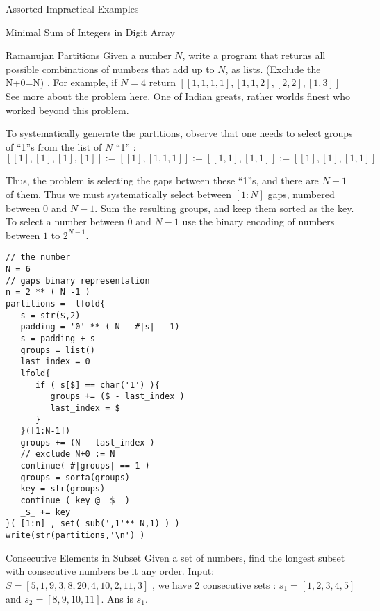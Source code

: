 \begin{section}{Assorted Impractical Examples}
\begin{subsection}{Minimal Sum of Integers in Digit Array}
\end{subsection}

\begin{subsection}{Ramanujan Partitions}
Given a number $N$, write a program that returns all possible combinations of numbers that add up to $N$, as lists. 
(Exclude the N+0=N) . For example, if $N=4$ return $[[1,1,1,1],[1,1,2],[2,2],[1,3]]$
See more about the problem \href{https://en.wikipedia.org/wiki/Partition\_(number\_theory)}{here}. 
One of Indian greats, rather worlds finest who \href{https://en.wikipedia.org/wiki/Ramanujan\%27s\_congruences}{worked} 
beyond this problem.

To systematically generate the partitions, observe that one needs to select groups of ``1''s from the list of $N$ ``1'' :
$$
[[1],[1],[1],[1]] := [ [1],[1,1,1] ] := [[1,1] ,[1,1] ] := [[1],[1],[1,1] ]
$$

Thus, the problem is selecting the gaps between these ``1''s, and there are $N-1$ of them.
Thus we must systematically select between $[1:N]$ gaps, numbered between $0$ and $N-1$. 
Sum the resulting groups, and keep them sorted as the key. To select a number between $0$ and $N-1$
use the binary encoding of numbers between $1$ to $2^{N-1}$.

\begin{center}\begin{minipage}{\linewidth}
\begin{lstlisting}[style=JexlStyle]
// the number
N = 6
// gaps binary representation  
n = 2 ** ( N -1 ) 
partitions =  lfold{
   s = str($,2)
   padding = '0' ** ( N - #|s| - 1)
   s = padding + s
   groups = list() 
   last_index = 0
   lfold{
      if ( s[$] == char('1') ){
         groups += ($ - last_index )
         last_index = $ 
      }
   }([1:N-1]) 
   groups += (N - last_index )
   // exclude N+0 := N 
   continue( #|groups| == 1 )
   groups = sorta(groups)
   key = str(groups)
   continue ( key @ _$_ )
   _$_ += key 
}( [1:n] , set( sub(',1'** N,1) ) )
write(str(partitions,'\n') )
\end{lstlisting}  
\end{minipage}\end{center}

\end{subsection}

\begin{subsection}{Consecutive Elements in Subset}
Given a set of numbers, find the longest subset with consecutive numbers be it any order. 
Input: $S = [ 5, 1, 9, 3, 8, 20, 4, 10, 2, 11, 3] $ ,
we have 2 consecutive sets : $s_1 = [1, 2, 3, 4, 5]$ and
$s_2 = [ 8, 9, 10, 11]$. Ans is $s_1$.


\end{subsection}
\end{section}
